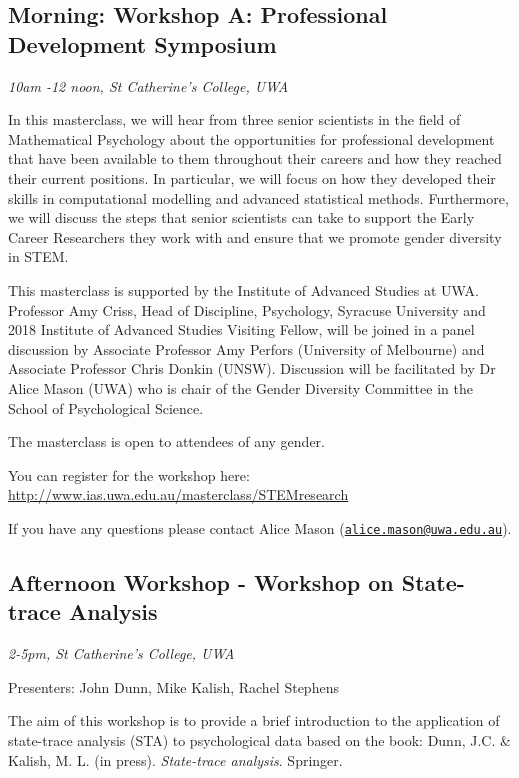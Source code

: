 \documentclass[]{article}
\begin{document}
\subsection{Morning: Workshop A: Professional Development
Symposium}\label{morning-workshop-a-professional-development-symposium}

\emph{10am -12 noon, St Catherine's College, UWA}

In this masterclass, we will hear from three senior scientists in the
field of Mathematical Psychology about the opportunities for
professional development that have been available to them throughout
their careers and how they reached their current positions. In
particular, we will focus on how they developed their skills in
computational modelling and advanced statistical methods. Furthermore,
we will discuss the steps that senior scientists can take to support the
Early Career Researchers they work with and ensure that we promote
gender diversity in STEM.

This masterclass is supported by the Institute of Advanced Studies at
UWA. Professor Amy Criss, Head of Discipline, Psychology, Syracuse
University and 2018 Institute of Advanced Studies Visiting Fellow, will
be joined in a panel discussion by Associate Professor Amy Perfors
(University of Melbourne) and Associate Professor Chris Donkin (UNSW).
Discussion will be facilitated by Dr Alice Mason (UWA) who is chair of
the Gender Diversity Committee in the School of Psychological Science.

The masterclass is open to attendees of any gender.

You can register for the workshop here:
\url{http://www.ias.uwa.edu.au/masterclass/STEMresearch}

If you have any questions please contact Alice Mason
(\href{mailto:alice.mason@uwa.edu.au}{\nolinkurl{alice.mason@uwa.edu.au}}).

\subsection{Afternoon Workshop - Workshop on State-trace
Analysis}\label{afternoon-workshop---workshop-on-state-trace-analysis}

\emph{2-5pm, St Catherine's College, UWA }

Presenters: John Dunn, Mike Kalish, Rachel Stephens

The aim of this workshop is to provide a brief introduction to the
application of state-trace analysis (STA) to psychological data based on
the book: Dunn, J.C. \& Kalish, M. L. (in press). \emph{State-trace
analysis}. Springer.
\end{document}
